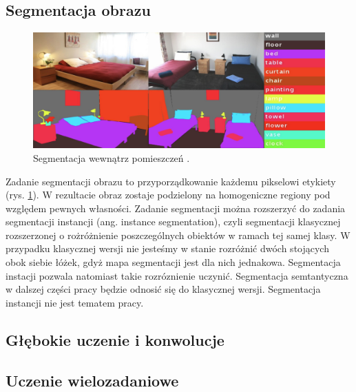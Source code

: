 \subsection{Segmentacja obrazu}
\begin{figure}
    \includegraphics[width=\textwidth]{img/segment.png}
    \caption{Segmentacja wewnątrz pomieszczeń \cite{zhang2018context}.}
    \label{fig:segment}
  \end{figure}
Zadanie segmentacji obrazu to przyporządkowanie każdemu pikselowi etykiety (rys. \ref{fig:segment}). W rezultacie obraz zostaje podzielony na homogeniczne regiony pod względem pewnych własności. Zadanie segmentacji można rozszerzyć do zadania segmentacji instancji (ang. instance segmentation), czyli segmentacji klasycznej rozszerzonej o rożróżnienie poszczególnych obiektów w ramach tej samej klasy. W przypadku klasycznej wersji nie jesteśmy w stanie rozróżnić dwóch stojących obok siebie łóżek, gdyż mapa segmentacji jest dla nich jednakowa. Segmentacja instacji pozwala natomiast takie rozróznienie uczynić. Segmentacja semtantyczna w dalszej części pracy będzie odnosić się do klasycznej wersji. Segmentacja instancji nie jest tematem pracy.

\subsection{Głębokie uczenie i konwolucje}
\subsection{Uczenie wielozadaniowe}
